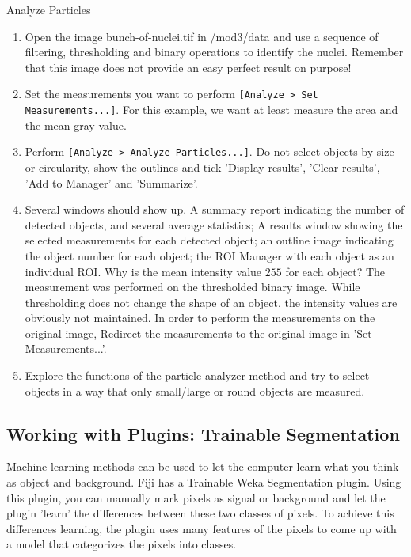 \begin{taskbox}{Analyze Particles}
\begin{enumerate}
	\item Open the image bunch-of-nuclei.tif in /mod3/data and use a sequence of filtering, thresholding and binary operations to identify the nuclei. Remember that this image does not provide an easy perfect result on purpose!
	\item Set the measurements you want to perform \texttt{[Analyze > Set Measurements...]}. For this example, we want at least measure the area and the mean gray value. 
	\item Perform \texttt{[Analyze > Analyze Particles...]}. Do not select objects by size or circularity, show the outlines and tick 'Display results', 'Clear results', 'Add to Manager' and 'Summarize'.
	\item Several windows should show up. A summary report indicating the number of detected objects, and several average statistics; A results window showing the selected measurements for each detected object; an outline image indicating the object number for each object; the ROI Manager with each object as an individual ROI. Why is the mean intensity value $255$ for each object? The measurement was performed on the thresholded binary image. While thresholding does not change the shape of an object, the intensity values are obviously not maintained. In order to perform the measurements on the original image, Redirect the measurements to the original image in 'Set Measurements...'.
	\item Explore the functions of the particle-analyzer method and try to select objects in a way that only small/large or round objects are measured.
	\end{enumerate}
\end{taskbox}

\subsection{Working with Plugins: Trainable Segmentation}
Machine learning methods can be used to let the computer learn what you think as object and background. Fiji has a Trainable Weka Segmentation plugin. Using this plugin, you can manually mark pixels as signal or background and let the plugin 'learn' the differences between these two classes of pixels. To achieve this differences learning, the plugin uses many features of the pixels to come up with a model that categorizes the pixels into classes. 

